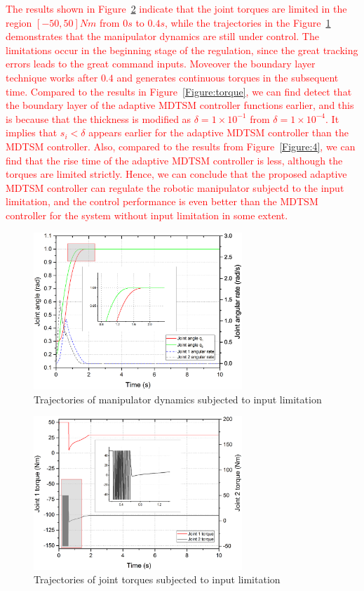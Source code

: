 \documentclass[3p]{elsarticle}
\theoremstyle{plain}
\theoremstyle{remark}
\begin{document}
\textcolor{red}{The results shown in Figure~\ref{Figure:limitation_torque} indicate that the joint torques are limited in the region $[-50,50]Nm$ from $0s$ to $0.4s$, while the trajectories in the Figure~\ref{Figure:limitation_q} demonstrates that the manipulator dynamics are still under control. The limitations occur in the beginning stage of the regulation, since the great tracking errors leads to the great command inputs. Moveover the boundary layer technique works after $0.4$ and generates continuous torques in the subsequent time. Compared to the results in Figure~\ref{Figure:torque}, we can find detect that the boundary layer of the adaptive MDTSM controller functions earlier, and this is because that the thickness is modified as $\delta=1\times 10^{-1}$ from $\delta=1\times 10^{-4}$. It implies that $s_i<\delta$ appears earlier for the adaptive MDTSM controller than the MDTSM controller. Also, compared to the results from Figure~\ref{Figure:4}, we can find that the rise time of the adaptive MDTSM controller is less, although the torques are limited strictly. Hence, we can conclude that the proposed adaptive MDTSM controller can regulate the robotic manipulator subjectd to the input limitation, and the control performance is even better than the MDTSM controller for the system without input limitation in some extent.}
\begin{figure}
\centering
\includegraphics[width=0.7\textwidth]{paper3_fig_limitation_q.eps}
\caption{Trajectories of manipulator dynamics subjected to input limitation}
\label{Figure:limitation_q}
\end{figure}
\begin{figure}
\centering
\includegraphics[width=0.7\textwidth]{paper3_fig_limitation_torque.eps}
\caption{Trajectories of joint torques subjected to  input limitation}
\label{Figure:limitation_torque}
\end{figure}
\end{document}
